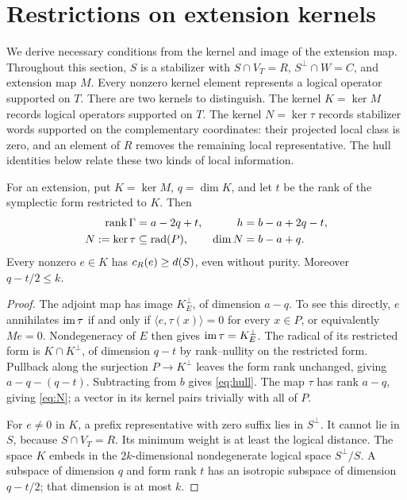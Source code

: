 \section{Restrictions on extension kernels}\label{sec:obstructions}

We derive necessary conditions from the kernel and image of the extension
map. Throughout this section, \(S\) is a stabilizer with
\(S\cap V_T=R\), \(S^\perp\cap W=C\), and extension map \(M\).
Every nonzero kernel element represents a logical operator supported on
\(T\).
There are two kernels to distinguish. The kernel \(K=\ker M\) records
logical operators supported on \(T\). The kernel \(N=\ker\tau\)
records stabilizer words supported on the complementary coordinates:
their projected local class is zero, and an element of \(R\) removes
the remaining local representative. The hull identities below relate
these two kinds of local information.

\begin{proposition}\label{prop:kernel}
For an extension, put \(K=\ker M\), \(q=\dim K\), and let \(t\) be the
rank of the symplectic form restricted to \(K\). Then
\begin{align}
 \operatorname{rank}\Gamma&=a-2q+t,&
 h&=b-a+2q-t,\label{eq:hull}\\
 N:=\ker\tau&\subseteq\operatorname{rad}(P),&
 \dim N&=b-a+q.\label{eq:N}
\end{align}
Every nonzero \(e\in K\) has \(c_R(e)\geq d(S)\), even without
purity. Moreover \(q-t/2\leq k\).
\end{proposition}
\begin{proof}
The adjoint map has image \(K^\perp_E\), of dimension \(a-q\).
To see this directly, \(e\) annihilates \(\operatorname{im}\tau\) if and only
if \(\langle e,\tau(x)\rangle=0\) for every \(x\in P\), or
equivalently \(Me=0\). Nondegeneracy of \(E\) then gives
\(\operatorname{im}\tau=K^\perp_E\).
The radical of its restricted form is \(K\cap K^\perp\), of dimension
\(q-t\) by rank--nullity on the restricted form. Pullback along the surjection \(P\to K^\perp\) leaves
the form rank unchanged, giving \(a-q-(q-t)\). Subtracting from \(b\)
gives \eqref{eq:hull}. The map \(\tau\) has rank \(a-q\), giving
\eqref{eq:N}; a vector in its kernel pairs trivially with all of \(P\).

For \(e\ne0\) in \(K\), a prefix representative with zero suffix lies
in \(S^\perp\). It cannot lie in \(S\), because \(S\cap V_T=R\).
Its minimum weight is at least the logical distance. The space
\(K\) embeds in the \(2k\)-dimensional nondegenerate logical space
\(S^\perp/S\). A subspace of dimension \(q\) and form rank \(t\)
has an isotropic subspace of dimension \(q-t/2\); that dimension is at
most \(k\).
\end{proof}

